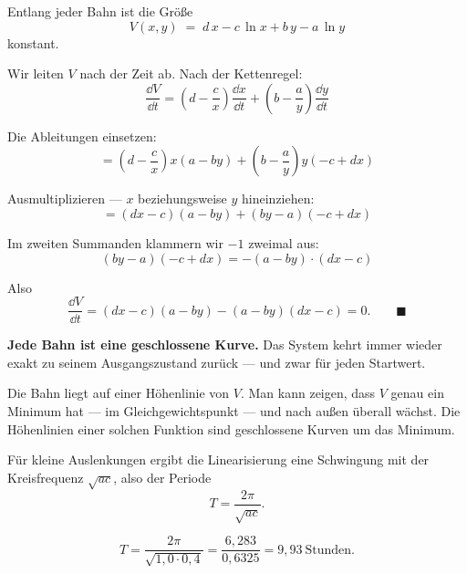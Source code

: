 \begin{merksatz}
Entlang jeder Bahn ist die Größe
\[ V(x,y) \;=\; d\,x - c\,\ln x + b\,y - a\,\ln y \]
konstant.

Wir leiten $V$ nach der Zeit ab. Nach der Kettenregel:
\[ \frac{\dd V}{\dd t} = \left(d - \frac{c}{x}\right)\frac{\dd x}{\dd t} + \left(b - \frac{a}{y}\right)\frac{\dd y}{\dd t} \]

Die Ableitungen einsetzen:
\[ = \left(d - \frac{c}{x}\right)x(a-by) + \left(b - \frac{a}{y}\right)y(-c+dx) \]

Ausmultiplizieren --- $x$ beziehungsweise $y$ hineinziehen:
\[ = (dx - c)(a-by) + (by - a)(-c+dx) \]

Im zweiten Summanden klammern wir $-1$ zweimal aus:
\[ (by-a)(-c+dx) = -(a-by)\cdot(dx-c) \]

Also
\[ \frac{\dd V}{\dd t} = (dx-c)(a-by) - (a-by)(dx-c) = 0 . \qquad \blacksquare \]
\end{merksatz}

\begin{merksatz}
\begin{center}
\begin{minipage}{0.9\textwidth}
\textbf{Jede Bahn ist eine geschlossene Kurve.} Das System kehrt immer wieder exakt zu seinem Ausgangszustand zurück --- und zwar für jeden Startwert.
\end{minipage}
\end{center}

Die Bahn liegt auf einer Höhenlinie von $V$. Man kann zeigen, dass $V$ genau ein Minimum hat --- im Gleichgewichtspunkt --- und nach außen überall wächst. Die Höhenlinien einer solchen Funktion sind geschlossene Kurven um das Minimum.

Für kleine Auslenkungen ergibt die Linearisierung eine Schwingung mit der Kreisfrequenz $\sqrt{ac}$, also der Periode
\[ T = \frac{2\pi}{\sqrt{ac}} . \]

\[ T = \frac{2\pi}{\sqrt{1{,}0 \cdot 0{,}4}} = \frac{6{,}283}{0{,}6325} = 9{,}93\ \text{Stunden} . \]

\begin{center}
\begin{minipage}{0.88\textwidth}
\end{minipage}
\end{center}
\end{merksatz}


